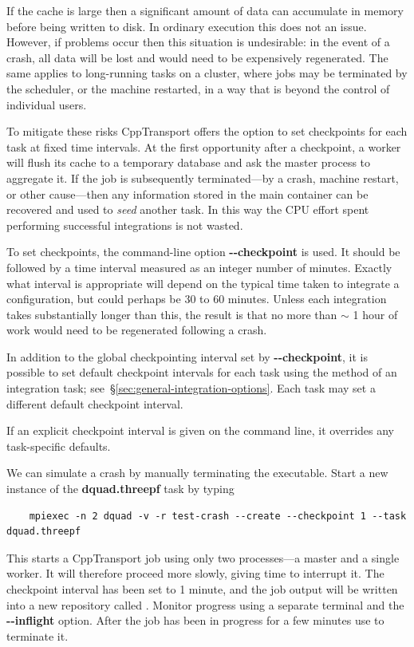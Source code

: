 \documentclass[11pt,a4paper]{article}
\renewcommand{\texttt}[1]{{\ttfamily\fontseries{l}\selectfont{#1}}}
\newcounter{advancedbox}[section]
\newenvironment{advanced}[1]{\stepcounter{advancedbox}\begin{tcolorbox}[enhanced,breakable,colback=red!10,colbacktitle=red!20,colframe=red!40,coltitle=black,title={Advanced usage: {#1}},fonttitle=\sffamily\fontseries{b}\selectfont]}{\end{tcolorbox}}
\newcommand{\repoobject}[1]{{\ttfamily\bfseries\small #1}}
\newcommand{\packagefont}{\sffamily}
\newcommand{\CppTransport}{{\packagefont CppTransport}}
\newcommand{\file}[1]{\texttt{{#1}}}
\newcommand{\option}[1]{{\ttfamily\bfseries\small #1}}
\newcommand{\semibold}[1]{{\fontseries{b}\selectfont{#1}}}
\newcommand{\para}[1]{\par\vspace{2mm}\noindent\semibold{{#1.}---}\ignorespaces}
\begin{document}
If the cache is large then a significant amount of data can
accumulate in memory before being written to disk.
In ordinary execution this does not an issue.
However, if problems occur then this situation is
undesirable:
in the event of a crash, all data will be lost
and would need to be expensively regenerated.
The same applies to long-running tasks on a cluster,
where jobs may be terminated by the scheduler,
or the machine restarted,
in a way that is beyond the control of individual users.

To mitigate these risks {\CppTransport} offers the option
to set checkpoints for each task
at fixed time intervals.
At the first opportunity after a checkpoint,
a worker will flush its cache to a temporary database
and ask the master process to aggregate it.
If the job is subsequently terminated---by a crash,
machine restart, or other cause---then any information
stored in the main container can be recovered
and used to \emph{seed} another task.
In this way the CPU effort spent performing successful
integrations is not wasted.

To set checkpoints, the command-line option
\option{{-}{-}checkpoint} is used. It should be followed
by a time interval measured as an integer number of minutes.
Exactly what interval is appropriate will depend on the
typical time taken to integrate a configuration,
but could perhaps be 30 to 60 minutes.
Unless each integration takes substantially longer
than this, the result is that no more than $\sim$ 1 hour
of work would need to be regenerated following a crash.

\begin{advanced}{Setting default checkpoints for a task}
    In addition to the global checkpointing interval set by
    \option{{-}{-}checkpoint}, it is possible to set default
    checkpoint intervals for each task
    using the \texttt{set_default_checkpoint()}
    method of an integration task; see~\S\ref{sec:general-integration-options}.
    Each task may set a different default checkpoint interval.
    
    If an explicit checkpoint interval is given on the
    command line, it overrides
    any task-specific defaults.
\end{advanced}

\para{Example}
We can simulate a crash by manually terminating
the \file{dquad} executable.
Start a new instance of the
\repoobject{dquad.threepf} task by typing
\begin{verbatim}
    mpiexec -n 2 dquad -v -r test-crash --create --checkpoint 1 --task dquad.threepf
\end{verbatim}
This starts a {\CppTransport} job using only two
processes---a master and a single worker. It will therefore proceed
more slowly, giving time to interrupt it.
The checkpoint interval has been set to 1 minute, and
the job output will be written into a new repository called
\file{test-crash}.
Monitor progress using a separate terminal and the
\option{{-}{-}inflight} option.
After the job has been in progress for a few minutes use
\texttt{Ctrl-C}
to terminate it.
\end{document}
